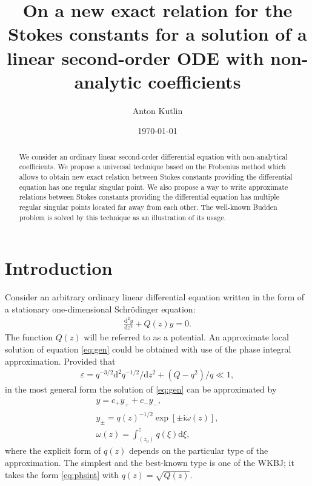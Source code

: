 \documentclass[aip,jmp,reprint]{revtex4-1}
\def\rmi{\mathrm{i}}
\def\rmd{\mathrm{d}}
\def\w{\omega}
\newcommand\phsintgrnd[1][z]{q(#1)}
\newcommand\predexp[1][z]{q(#1)^{-1/2}}
\newcommand\phsintgrl[3][z]{\int_{#2}^{#3} \phsintgrnd[#1] \rmd #1}
\begin{document}
\title{On a new exact relation for the Stokes constants for a solution of 
a linear second-order ODE with non-analytic coefficients}
\author{Anton Kutlin}

\date{\today}

\begin{abstract}
We consider an ordinary linear second-order differential equation with non-analytical coefficients.
We propose a universal technique based on the Frobenius method which allows to obtain new exact relation 
between Stokes constants providing the differential equation has one regular singular point.
We also propose a way to write approximate relations between Stokes constants providing the differential 
equation has multiple regular singular points located far away from each other.
The well-known Budden problem is solved by this technique as an illustration of its usage.
\end{abstract}


\maketitle

\section{Introduction \label{sec:intro}}
Consider an arbitrary ordinary linear differential equation written in the form of 
a stationary one-dimensional Schr\"odinger equation:
\begin{eqnarray}
\frac{\rmd^2 y}{\rmd z^2} + Q(z)y = 0.   \label{eq:gen}
\end{eqnarray}
The function $Q(z)$ will be referred to as a potential. An approximate local solution 
of equation \eqref{eq:gen} could be obtained with use of the phase integral approximation\cite{frbook}. 
Provided that 
\begin{eqnarray}
\varepsilon = q^{-3/2} \rmd^2 q^{-1/2}/\rmd z^2  + (Q - q^2)/q \ll 1,   \label{eq:cond}
\end{eqnarray}
in the most general form the solution of \eqref{eq:gen} can be approximated by
\begin{subequations}
\begin{eqnarray}
y = c_+y_+ + c_-y_-, \label{eq:gensol}
\\
y_\pm = \predexp \exp [\pm \rmi \w(z)], \label{eq:phsint}
\\
\w(z)=\phsintgrl[\xi]{(z_0)}{z}, \label{eq:phsintgrl}
\end{eqnarray}
\end{subequations}
where the explicit form of $q(z)$ depends on the particular type of the approximation.
The simplest and the best-known type is one of the WKBJ\cite{wkb1,wkb2,wkb3,wkbj}; 
it takes the form \eqref{eq:phsint} with $\phsintgrnd = \sqrt{Q(z)}$.
\end{document}
